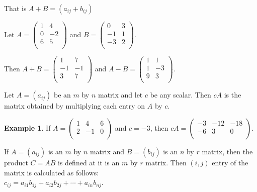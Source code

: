 \documentclass[11pt,a4paper]{article}
\theoremstyle{definition}
\newtheorem{exa}[thm]{Example}
\begin{document}
That is $A+B=(a_{ij}+b_{ij})$

Let $A=
\begin{pmatrix}
1&4\\0&-2\\6&5\\
\end{pmatrix}
$ and 
$B=
\begin{pmatrix}
0&3\\-1&1\\-3&2\\
\end{pmatrix}
$.

Then $A+B=
\begin{pmatrix}
1&7\\-1&-1\\3&7\\
\end{pmatrix}
$ and 
$
A-B=
\begin{pmatrix}
1&1\\1&-3\\9&3\\
\end{pmatrix}
$.

Let $A=(a_{ij})$ be an $m$ by $n$ matrix and let $c$ be any scalar. Then $cA$ is the matrix obtained by multiplying each entry on $A$ by $c$.


\begin{exa}
If $A=
\begin{pmatrix}
1&4&6\\2&-1&0\\
\end{pmatrix}
$ and $c=-3$, then $cA=
\begin{pmatrix}
-3&-12&-18\\-6&3&0\\
\end{pmatrix}
$.

If $A=(a_{ij})$ is an $m$ by $n$ matrix and $B=(b_{ij})$ is an $n$ by $r$ matrix, then the product $C=AB$ is defined at it is an $m$ by $r$ matrix. Then $(i,j)$ entry of the matrix is calculated as follows:\\ $c_{ij}=a_{i1}b_{1j}+a_{i2}b_{2j}+\cdots+a_{in}b_{nj}$.
\end{exa}
\end{document}
